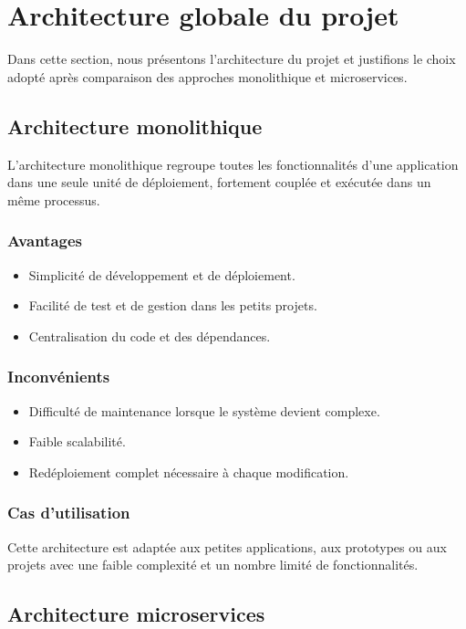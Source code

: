 \section{Architecture globale du projet}

Dans cette section, nous présentons l’architecture du projet et justifions le choix adopté après comparaison des approches monolithique et microservices. 
\subsection{Architecture monolithique}

L’architecture monolithique regroupe toutes les fonctionnalités d’une application  dans une seule unité de déploiement, fortement couplée et exécutée dans un même processus\cite{ibm_monolithic_architecture}.
\subsubsection{Avantages}
\begin{itemize}
    \item Simplicité de développement et de déploiement.
    \item Facilité de test et de gestion dans les petits projets.
    \item Centralisation du code et des dépendances.
\end{itemize}

\subsubsection{Inconvénients}
\begin{itemize}
    \item Difficulté de maintenance lorsque le système devient complexe.
    \item Faible scalabilité.
    \item Redéploiement complet nécessaire à chaque modification.
\end{itemize}

\subsubsection{Cas d’utilisation}
Cette architecture est adaptée aux petites applications, aux prototypes ou aux projets avec une faible complexité et un nombre limité de fonctionnalités.

\subsection{Architecture microservices}


